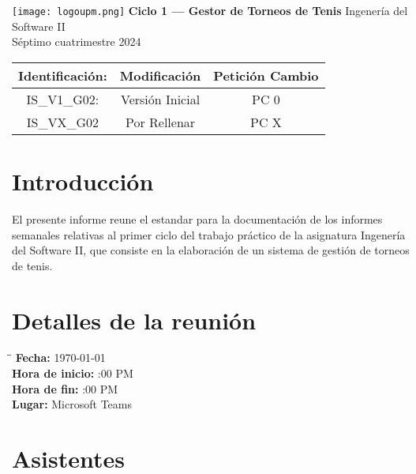\documentclass[titlepage,a4paper]{article}
\begin{document}
\begin{titlepage} %
	\hfill\texttt{[image: logoupm.png]}
    \centering
    \vfill
    \Huge \textbf{Ciclo 1 — Gestor de Torneos de Tenis}
    \vskip2cm
    \Large Ingenería del Software II\\
    Séptimo cuatrimestre 2024 
    \vfill
    \begin{tabular}{ | c | c | c | } %
      \hline
      Identificación: & Modificación & Petición Cambio \\ \hline 
      IS\_V1\_G02: & Versión Inicial & PC 0 \\ \hline
      IS\_VX\_G02 & Por Rellenar & PC X \\ \hline
  	\end{tabular}
    \vfill
    \vfill
\end{titlepage}

\tableofcontents %
\newpage

\section{Introducción}\label{sec:intro} 
El presente informe reune el estandar para la documentación de los informes semanales relativas al primer ciclo del trabajo práctico de la asignatura Ingenería del Software II, que consiste en la elaboración de un sistema de gestión de torneos de tenis. 

\section{Detalles de la reunión}

\begin{tabbing}
\hspace{3cm}\=\hspace{5cm}\=\kill
\textbf{Fecha:} \> \today \\
\textbf{Hora de inicio:} :00 PM \\
\textbf{Hora de fin:} :00 PM \\
\textbf{Lugar:} \> Microsoft Teams \\
\end{tabbing}

\vspace{0.5cm}

\section{Asistentes}
\end{document}

